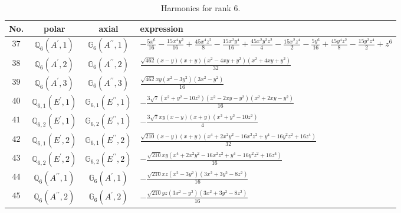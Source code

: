 \documentclass[fleqn,8pt,landscape]{jsarticle}
\begin{document}
\begin{table}[ht!]
\begin{center}
\caption{Harmonics for rank 6.}
\renewcommand{\arraystretch}{1.3}
\begin{tabular}{cccl} \hline \hline
No. & polar & axial & expression \\ \hline
$ 37 $ & $ \mathbb{Q}_{6}(A^{\prime},1) $ & $ \mathbb{G}_{6}(A^{\prime\prime},1) $ & $ - \frac{5 x^{6}}{16} - \frac{15 x^{4} y^{2}}{16} + \frac{45 x^{4} z^{2}}{8} - \frac{15 x^{2} y^{4}}{16} + \frac{45 x^{2} y^{2} z^{2}}{4} - \frac{15 x^{2} z^{4}}{2} - \frac{5 y^{6}}{16} + \frac{45 y^{4} z^{2}}{8} - \frac{15 y^{2} z^{4}}{2} + z^{6} $ \\
$ 38 $ & $ \mathbb{Q}_{6}(A^{\prime},2) $ & $ \mathbb{G}_{6}(A^{\prime\prime},2) $ & $ \frac{\sqrt{462} \left(x - y\right) \left(x + y\right) \left(x^{2} - 4 x y + y^{2}\right) \left(x^{2} + 4 x y + y^{2}\right)}{32} $ \\
$ 39 $ & $ \mathbb{Q}_{6}(A^{\prime},3) $ & $ \mathbb{G}_{6}(A^{\prime\prime},3) $ & $ \frac{\sqrt{462} x y \left(x^{2} - 3 y^{2}\right) \left(3 x^{2} - y^{2}\right)}{16} $ \\
$ 40 $ & $ \mathbb{Q}_{6,1}(E^{\prime},1) $ & $ \mathbb{G}_{6,1}(E^{\prime\prime},1) $ & $ - \frac{3 \sqrt{7} \left(x^{2} + y^{2} - 10 z^{2}\right) \left(x^{2} - 2 x y - y^{2}\right) \left(x^{2} + 2 x y - y^{2}\right)}{16} $ \\
$ 41 $ & $ \mathbb{Q}_{6,2}(E^{\prime},1) $ & $ \mathbb{G}_{6,2}(E^{\prime\prime},1) $ & $ - \frac{3 \sqrt{7} x y \left(x - y\right) \left(x + y\right) \left(x^{2} + y^{2} - 10 z^{2}\right)}{4} $ \\
$ 42 $ & $ \mathbb{Q}_{6,1}(E^{\prime},2) $ & $ \mathbb{G}_{6,1}(E^{\prime\prime},2) $ & $ \frac{\sqrt{210} \left(x - y\right) \left(x + y\right) \left(x^{4} + 2 x^{2} y^{2} - 16 x^{2} z^{2} + y^{4} - 16 y^{2} z^{2} + 16 z^{4}\right)}{32} $ \\
$ 43 $ & $ \mathbb{Q}_{6,2}(E^{\prime},2) $ & $ \mathbb{G}_{6,2}(E^{\prime\prime},2) $ & $ - \frac{\sqrt{210} x y \left(x^{4} + 2 x^{2} y^{2} - 16 x^{2} z^{2} + y^{4} - 16 y^{2} z^{2} + 16 z^{4}\right)}{16} $ \\
$ 44 $ & $ \mathbb{Q}_{6}(A^{\prime\prime},1) $ & $ \mathbb{G}_{6}(A^{\prime},1) $ & $ - \frac{\sqrt{210} x z \left(x^{2} - 3 y^{2}\right) \left(3 x^{2} + 3 y^{2} - 8 z^{2}\right)}{16} $ \\
$ 45 $ & $ \mathbb{Q}_{6}(A^{\prime\prime},2) $ & $ \mathbb{G}_{6}(A^{\prime},2) $ & $ - \frac{\sqrt{210} y z \left(3 x^{2} - y^{2}\right) \left(3 x^{2} + 3 y^{2} - 8 z^{2}\right)}{16} $ \\

\end{tabular}
\end{center}
\end{table}
\end{document}
